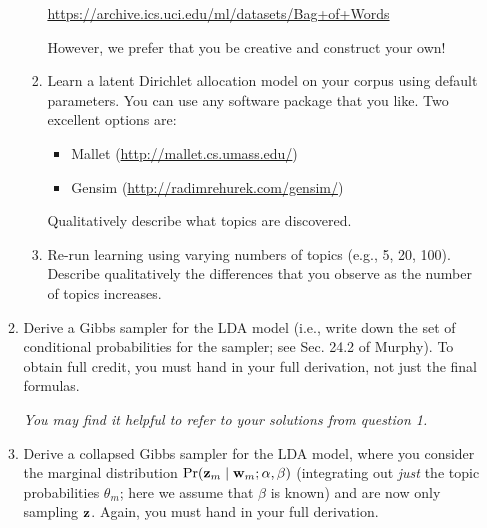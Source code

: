 \documentclass{article}
\begin{document}
\begin{enumerate}
\begin{enumerate}
\begin{enumerate}
\begin{centering}\url{https://archive.ics.uci.edu/ml/datasets/Bag+of+Words}\end{centering}

However, we prefer that you be creative and construct your own!

\item Learn a latent Dirichlet allocation model on your corpus using
  default parameters. You can use any software package that you like. Two excellent
  options are:
\begin{itemize}
\item Mallet (\url{http://mallet.cs.umass.edu/})
\item Gensim (\url{http://radimrehurek.com/gensim/})
\end{itemize}
Qualitatively describe what topics are discovered.

\item Re-run learning using varying numbers of topics (e.g., 5, 20,
  100). Describe qualitatively the differences that you observe 
  as the number of topics increases.
\end{enumerate}

\item Derive a Gibbs sampler for the LDA model (i.e., write down the
set of conditional probabilities for the sampler; see Sec. 24.2 of
Murphy). To obtain full credit, you must hand in your full derivation,
not just the final formulas.

{\em You may find it helpful to refer to your solutions from question 1.}

\item Derive a collapsed Gibbs sampler for the LDA model,
  where you consider the marginal distribution $\Pr({\bf z}_m \mid
  {\bf w}_m ; \alpha, \beta)$ (integrating out {\em just} the topic probabilities
  $\theta_m$; here we assume that $\beta$ is known) and are now only sampling ${\bf z}$. Again, you must
  hand in your full derivation.




\end{enumerate}
\end{enumerate}
\end{document}
